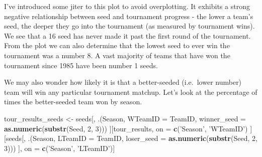 \documentclass[]{article}
\newenvironment{Shaded}{\begin{snugshade}}{\end{snugshade}}
\newcommand{\KeywordTok}[1]{\textcolor[rgb]{0.13,0.29,0.53}{\textbf{#1}}}
\newcommand{\DataTypeTok}[1]{\textcolor[rgb]{0.13,0.29,0.53}{#1}}
\newcommand{\DecValTok}[1]{\textcolor[rgb]{0.00,0.00,0.81}{#1}}
\newcommand{\StringTok}[1]{\textcolor[rgb]{0.31,0.60,0.02}{#1}}
\newcommand{\NormalTok}[1]{#1}
\begin{document}
I've introduced some jiter to this plot to avoid overplotting. It
exhibits a strong negative relationship between seed and tournament
progress - the lower a team's seed, the deeper they go into the
tournament (as measured by tournament wins). We see that a 16 seed has
never made it past the first round of the tournament. From the plot we
can also determine that the lowest seed to ever win the tournament was a
number 8. A vast majority of teams that have won the tournament since
1985 have been number 1 seeds.

We may also wonder how likely it is that a better-seeded (i.e.~lower
number) team will win any particular tournament matchup. Let's look at
the percentage of times the better-seeded team won by season.

\begin{Shaded}
\begin{Highlighting}[]
\NormalTok{tour_results_seeds <-}\StringTok{ }\NormalTok{seeds[, .(Season, }\DataTypeTok{WTeamID =}\NormalTok{ TeamID, }\DataTypeTok{winner_seed =} \KeywordTok{as.numeric}\NormalTok{(}\KeywordTok{substr}\NormalTok{(Seed, }\DecValTok{2}\NormalTok{, }\DecValTok{3}\NormalTok{)))}
\NormalTok{                            ][tour_results, on =}\StringTok{ }\KeywordTok{c}\NormalTok{(}\StringTok{'Season'}\NormalTok{, }\StringTok{'WTeamID'}\NormalTok{)}
\NormalTok{                              ][seeds[, .(Season, }\DataTypeTok{LTeamID =}\NormalTok{ TeamID, }\DataTypeTok{loser_seed =} \KeywordTok{as.numeric}\NormalTok{(}\KeywordTok{substr}\NormalTok{(Seed, }\DecValTok{2}\NormalTok{, }\DecValTok{3}\NormalTok{)))}
\NormalTok{                                      ], on =}\StringTok{ }\KeywordTok{c}\NormalTok{(}\StringTok{'Season'}\NormalTok{, }\StringTok{'LTeamID'}\NormalTok{)]}




\end{Highlighting}
\end{Shaded}
\end{document}
